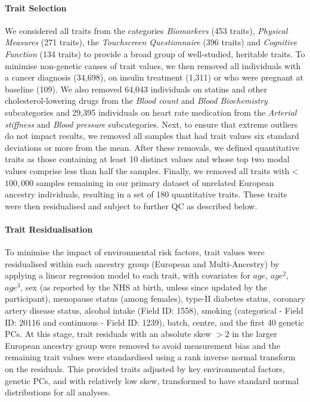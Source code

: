 \documentclass[12pt]{zHenriquesLab-StyleBioRxiv}
\begin{document}
{{\paragraph*{Trait Selection} 
We considered all traits from the categories \textit{Biomarkers} (453 traits), 
\textit{Physical Measures} (271 traits), the \textit{Touchscreen Questionnaire} (396 traits) 
and \textit{Cognitive Function} (134 traits) to provide a broad group of well-studied, heritable traits. 
To minimise non-genetic causes of trait values, we then removed all individuals with a cancer diagnosis (34,698), 
on insulin treatment (1,311) or who were pregnant at baseline (109). We also removed 64,043 individuals 
on statins and other cholesterol-lowering drugs from the \textit{Blood count} 
and \textit{Blood Biochemistry} subcategories and 29,395 individuals
on heart rate medication from the \textit{Arterial stiffness} and \textit{Blood pressure} subcategories.
Next, to ensure that extreme outliers do not impact results, we removed all samples that had 
trait values six standard deviations or more from the mean. After these removals, we defined quantitative traits as 
those containing at least 10 distinct values and whose top two modal values comprise less than 
half the samples. Finally, we removed all traits with < $100,000$ samples remaining in our 
primary dataset of unrelated European ancestry individuals, resulting in a set of 180 quantitative 
traits. These traits were then residualised and subject to further QC as described below. 
%
\paragraph*{Trait Residualisation}
To minimise the impact of environmental risk factors, trait values were 
residualised within each ancestry group (European and Multi-Ancestry) by applying a linear regression 
model to each trait, with covariates for $age$, $age^2$, $age^3$, sex (as reported by the NHS at birth, unless 
since updated by the participant), menopause status (among females), %
type-II diabetes status, coronary artery disease status, alcohol intake (Field ID: 1558), 
smoking (categorical - Field ID: 20116 and continuous - Field ID: 1239), 
batch, centre, and the first 40 genetic PCs.  
At this stage, trait residuals with an absolute skew $>2$ \cite{skew_book} 
in the larger European ancestry group were removed to avoid measurement bias and 
the remaining trait values were standardised using a rank inverse 
normal transform on the residuals. This provided traits adjusted by key environmental factors, genetic 
PCs, and with relatively low skew, transformed to have standard normal distributions for all analyses. 
%
}}
\end{document}
